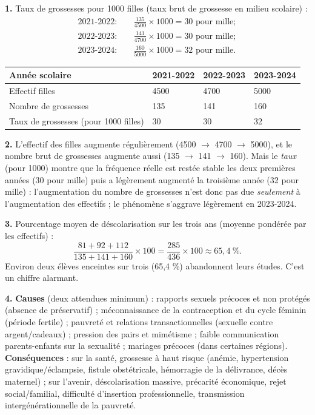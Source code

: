 \documentclass[11pt]{article}
\begin{document}
\begin{corrige}

\textbf{1.} Taux de grossesses pour 1000 filles (taux brut de grossesse en milieu scolaire) :
\begin{align*}
2021\text{-}2022 : \quad & \frac{135}{\num{4500}}\times 1000 = 30 \text{ pour mille} ;\\
2022\text{-}2023 : \quad & \frac{141}{\num{4700}}\times 1000 = 30 \text{ pour mille} ;\\
2023\text{-}2024 : \quad & \frac{160}{\num{5000}}\times 1000 = 32 \text{ pour mille}.
\end{align*}

\begin{center}
\begin{tabularx}{\linewidth}{|l|X|X|X|}
\hline
\rowcolor{popblueL} \textbf{Année scolaire} & \textbf{2021-2022} & \textbf{2022-2023} & \textbf{2023-2024} \\
\hline
Effectif filles & \num{4500} & \num{4700} & \num{5000} \\
Nombre de grossesses & 135 & 141 & 160 \\
Taux de grossesses (pour 1000 filles) & 30 & 30 & 32 \\
\hline
\end{tabularx}
\end{center}

\textbf{2.} L'effectif des filles augmente régulièrement (\num{4500} $\to$ \num{4700} $\to$ \num{5000}), et le nombre brut de grossesses augmente aussi (135 $\to$ 141 $\to$ 160). Mais le \emph{taux} (pour 1000) montre que la fréquence réelle est restée stable les deux premières années (30 pour mille) puis a légèrement augmenté la troisième année (32 pour mille) : l'augmentation du nombre de grossesses n'est donc pas due \emph{seulement} à l'augmentation des effectifs ; le phénomène s'aggrave légèrement en 2023-2024.

\textbf{3.} Pourcentage moyen de déscolarisation sur les trois ans (moyenne pondérée par les effectifs) :
\[
\frac{81+92+112}{135+141+160}\times 100 = \frac{285}{436}\times 100 \approx 65{,}4\ \%.
\]
Environ deux élèves enceintes sur trois (65,4 \%) abandonnent leurs études. C'est un chiffre alarmant.

\textbf{4.} \textbf{Causes} (deux attendues minimum) : rapports sexuels précoces et non protégés (absence de préservatif) ; méconnaissance de la contraception et du cycle féminin (période fertile) ; pauvreté et relations transactionnelles (sexuelle contre argent/cadeaux) ; pression des pairs et mimétisme ; faible communication parents-enfants sur la sexualité ; mariages précoces (dans certaines régions). \textbf{Conséquences} : sur la santé, grossesse à haut risque (anémie, hypertension gravidique/éclampsie, fistule obstétricale, hémorragie de la délivrance, décès maternel) ; sur l'avenir, déscolarisation massive, précarité économique, rejet social/familial, difficulté d'insertion professionnelle, transmission intergénérationnelle de la pauvreté.


\end{corrige}
\end{document}
